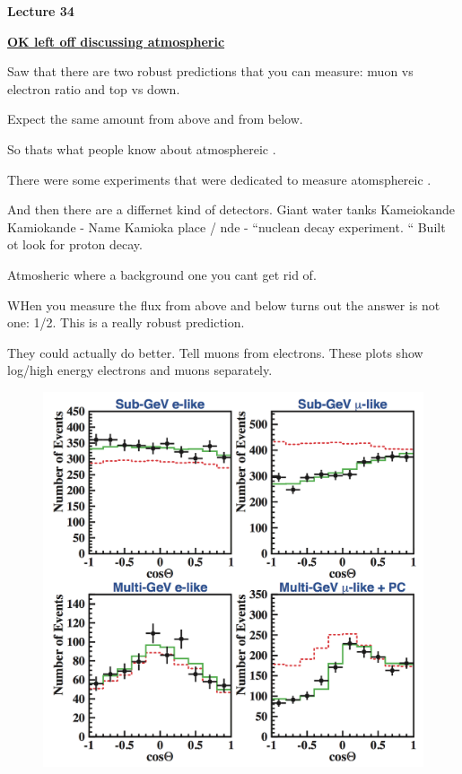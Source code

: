 \usepackage{fancyhdr}

\fancyhf{}


\thispagestyle{fancy}

\begin{center}
{\huge \textbf{Lecture 34}}
\end{center}

{\fontsize{14}{16}\selectfont

\textbf{\underline{OK left off discussing atmospheric \nus}} 

Saw that there are two robust predictions that you can measure:  muon vs electron ratio and top vs down. 

Expect the same amount from above and from below.

So thats what people know about atmosphereic \nus. 

There were some experiments that were dedicated to measure atomsphereic \nus.

And then there are a differnet kind of detectors. 
Giant water tanks Kameiokande
Kamiokande - Name Kamioka place / nde - ``nuclean decay experiment. ``
Built ot look for proton decay. 

Atmosheric \nus where a background one you cant get rid of. 

WHen you measure the flux from above and below turns out the answer is not one: 1/2.
This is a really robust prediction. 

They could actually do better. 
Tell muons from electrons.
These plots show log/high energy electrons and muons separately. 
\clearpage

\begin{figure}[h!]
\centering
\includegraphics[width=1.0\textwidth]{./sk.png}
\end{figure}
\clearpage

}
